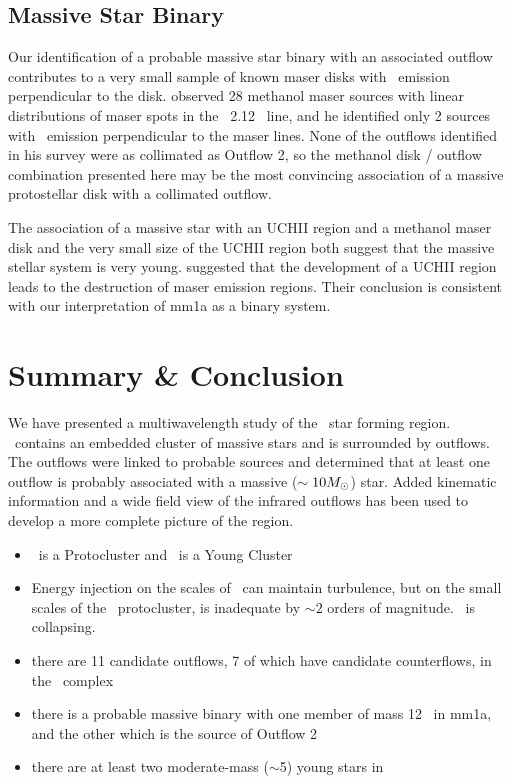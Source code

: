 \subsection{Massive Star Binary}
Our identification of a probable massive star binary with an associated outflow
contributes to a very small sample of known maser disks with \hh\ emission
perpendicular to the disk.  \citet{debuizer2003} observed 28 methanol maser
sources with linear distributions of maser spots in the \hh\ 2.12 \um\ line,
and he identified only 2 sources with \hh\ emission perpendicular to the maser
lines.  None of the outflows identified in his survey were as collimated as
Outflow 2, so the methanol disk / outflow combination presented here may be the
most convincing association of a massive protostellar disk with a collimated
outflow.

The association of a massive star with an UCHII region and a methanol maser
disk and the very small size of the UCHII region both suggest that the massive
stellar system is very young.  \citet{walsh1998} suggested that the development
of a UCHII region leads to the destruction of maser emission regions.  Their
conclusion is consistent with our interpretation of mm1a as a binary system. 

\section{Summary \& Conclusion}

We have presented a multiwavelength study of the \region\ star forming region.
\region\ contains an embedded cluster of massive stars and is surrounded by
outflows.  The outflows were linked to probable sources and determined that at
least one outflow is probably associated with a massive ($\sim 10 M_{\odot}$) star.
Added kinematic information and a wide field view of the infrared outflows has
been used to develop a more complete picture of the region.

\begin{itemize}
  \item \necluster\ is a Protocluster and \swcluster\ is a Young Cluster
  \item Energy injection on the scales of \region\ can maintain turbulence, but on
    the small scales of the \necluster\ protocluster, is inadequate by $\sim 2$ orders
    of magnitude.  \necluster\ is collapsing.
  \item there are 11 candidate outflows, 7 of which have candidate counterflows, in the 
    \region\ complex
  \item there is a probable massive binary with one member of mass 12 \msun\ in
    mm1a, and the other which is the source of Outflow 2
  \item there are at least two moderate-mass ($\sim$5\msun) young stars in \region\ 
\end{itemize}


